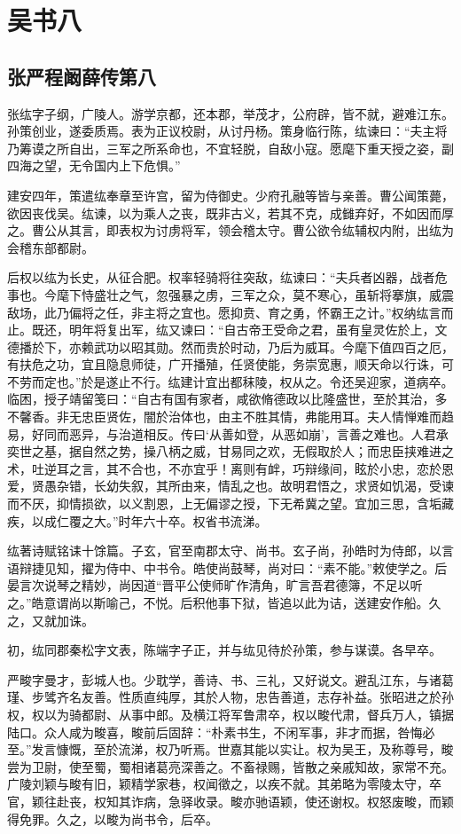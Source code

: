 \documentclass[12pt,UTF8]{ctexbook}
\begin{document}
\part{吴书八}
\chapter{张严程阚薛传第八}

张纮字子纲，广陵人。游学京都，还本郡，举茂才，公府辟，皆不就，避难江东。孙策创业，遂委质焉。表为正议校尉，从讨丹杨。策身临行陈，纮谏曰：“夫主将乃筹谟之所自出，三军之所系命也，不宜轻脱，自敌小寇。愿麾下重天授之姿，副四海之望，无令国内上下危惧。”

建安四年，策遣纮奉章至许宫，留为侍御史。少府孔融等皆与亲善。曹公闻策薨，欲因丧伐吴。纮谏，以为乘人之丧，既非古义，若其不克，成雠弃好，不如因而厚之。曹公从其言，即表权为讨虏将军，领会稽太守。曹公欲令纮辅权内附，出纮为会稽东部都尉。

后权以纮为长史，从征合肥。权率轻骑将往突敌，纮谏曰：“夫兵者凶器，战者危事也。今麾下恃盛壮之气，忽强暴之虏，三军之众，莫不寒心，虽斩将搴旗，威震敌场，此乃偏将之任，非主将之宜也。愿抑贲、育之勇，怀霸王之计。”权纳纮言而止。既还，明年将复出军，纮又谏曰：“自古帝王受命之君，虽有皇灵佐於上，文德播於下，亦赖武功以昭其勋。然而贵於时动，乃后为威耳。今麾下值四百之厄，有扶危之功，宜且隐息师徒，广开播殖，任贤使能，务崇宽惠，顺天命以行诛，可不劳而定也。”於是遂止不行。纮建计宜出都秣陵，权从之。令还吴迎家，道病卒。临困，授子靖留笺曰：“自古有国有家者，咸欲脩德政以比隆盛世，至於其治，多不馨香。非无忠臣贤佐，闇於治体也，由主不胜其情，弗能用耳。夫人情惮难而趋易，好同而恶异，与治道相反。传曰‘从善如登，从恶如崩’，言善之难也。人君承奕世之基，据自然之势，操八柄之威，甘易同之欢，无假取於人；而忠臣挟难进之术，吐逆耳之言，其不合也，不亦宜乎！离则有衅，巧辩缘间，眩於小忠，恋於恩爱，贤愚杂错，长幼失叙，其所由来，情乱之也。故明君悟之，求贤如饥渴，受谏而不厌，抑情损欲，以义割恩，上无偏谬之授，下无希冀之望。宜加三思，含垢藏疾，以成仁覆之大。”时年六十卒。权省书流涕。

纮著诗赋铭诔十馀篇。子玄，官至南郡太守、尚书。玄子尚，孙皓时为侍郎，以言语辩捷见知，擢为侍中、中书令。皓使尚鼓琴，尚对曰：“素不能。”敕使学之。后晏言次说琴之精妙，尚因道“晋平公使师旷作清角，旷言吾君德簿，不足以听之。”皓意谓尚以斯喻己，不悦。后积他事下狱，皆追以此为诘，送建安作船。久之，又就加诛。

初，纮同郡秦松字文表，陈端字子正，并与纮见待於孙策，参与谋谟。各早卒。

严畯字曼才，彭城人也。少耽学，善诗、书、三礼，又好说文。避乱江东，与诸葛瑾、步骘齐名友善。性质直纯厚，其於人物，忠告善道，志存补益。张昭进之於孙权，权以为骑都尉、从事中郎。及横江将军鲁肃卒，权以畯代肃，督兵万人，镇据陆口。众人咸为畯喜，畯前后固辞：“朴素书生，不闲军事，非才而据，咎悔必至。”发言慷慨，至於流涕，权乃听焉。世嘉其能以实让。权为吴王，及称尊号，畯尝为卫尉，使至蜀，蜀相诸葛亮深善之。不畜禄赐，皆散之亲戚知故，家常不充。广陵刘颖与畯有旧，颖精学家巷，权闻徵之，以疾不就。其弟略为零陵太守，卒官，颖往赴丧，权知其诈病，急驿收录。畯亦驰语颖，使还谢权。权怒废畯，而颖得免罪。久之，以畯为尚书令，后卒。
\end{document}
